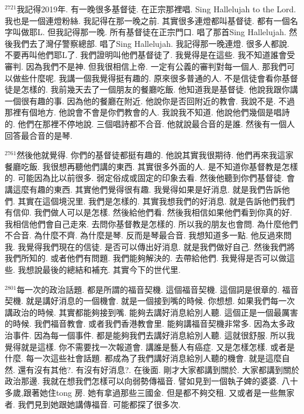 \documentclass{book}
\begin{document}
$^{2721}$我記得2019年.
有一晚很多基督徒.
在正宗那裡唱.
Sing Hallelujah to the Lord.
我也是一個連燈粉絲.
我記得在那一晚之前.
其實很多連燈都叫基督徒.
都有一個名字叫做耶L.
但我記得那一晚.
所有基督徒在正宗門口.
唱了那首Sing Hallelujah.
然後我們去了灣仔警察總部.
唱了Sing Hallelujah.
我記得那一晚連燈.
很多人都說.
不要再叫他們耶L了.
我們證明叫他們基督徒了.
我覺得是在這些.
我不知道誰會受審判.
因為我們不是神.
但我很相信上帝.
一定有公義的審判對每一個人.
那我們可以做些什麼呢.
我講一個我覺得挺有趣的.
原來很多普通的人.
不是信徒會看你基督徒是怎樣的.
我前幾天去了一個朋友的餐廳吃飯.
他知道我是基督徒.
他說我跟你講一個很有趣的事.
因為他的餐廳在附近.
他說你是否回附近的教會.
我說不是.
不過那裡有個地方.
他說會不會是你們教會的人.
我說我不知道.
他說他們幾個是唱詩的.
他們在那裡不停地說.
三個唱詩都不合音.
他就說最合音的是誰.
然後有一個人回答最合音的是琴.

$^{2761}$然後他就覺得.
你們的基督徒都挺有趣的.
他說其實我很期待.
他們再來我這家餐廳吃飯.
我很想再聽他們講的東西.
其實很多外面的人.
是不知道你基督教是怎樣的.
可能因為比以前很多.
弱定俗成或固定的印象去看.
然後他聽到你們基督徒.
會講這麼有趣的東西.
其實他們覺得很有趣.
我覺得如果是好消息.
就是我們告訴他們.
其實在這個境況里.
我們是怎樣的.
其實我想我們的好消息.
就是告訴他們我們有信仰.
我們做人可以是怎樣.
然後給他們看.
然後我相信如果他們看到你真的好.
我相信他們會自己走來.
去問你基督教是怎樣的.
所以我的朋友也會問.
為什麼他們不合音.
為什麼不齊.
為什麼是琴.
反而是琴最合音.
我想知道多一點.
他反過來問我.
我覺得我們現在的信徒.
是否可以傳出好消息.
就是我們做好自己.
然後我們將我們所知的.
或者他們有問題.
我們能夠解決的.
去帶給他們.
我覺得是否可以做這些.
我想說最後的總結和補充.
其實今下的世代里.

$^{2801}$每一次的政治話題.
都是所謂的福音契機.
這個福音契機.
這個詞是很章的.
福音契機.
就是講好消息的一個機會.
就是一個接到嘴的時候.
你想想.
如果我們每一次講政治的時候.
其實都能夠接到嘴.
能夠去講好消息給別人聽.
這個正是一個最厲害的時候.
我們福音教會.
或者我們香港教會里.
能夠講福音契機非常多.
因為太多政治事件.
因為每一個事件.
都是能夠我們去講好消息給別人聽.
這就很舒服.
所以我覺得就是這樣.
你不需要找一次報道會.
講誰是藝人有癌症.
又是怎樣怎樣.
或者是什麼.
每一次這些社會話題.
都成為了我們講好消息給別人聽的機會.
就是這麼自然.
還有沒有其他?.
有沒有好消息?.
在後面.
剛才大家都講到關於.
大家都講到關於政治那邊.
我就在想我們怎樣可以向弱勢傳福音.
譬如見到一個執子婢的婆婆.
八十多歲,跟著她住tong 房.
她有拿過那些三國金.
但是都不夠交租.
又或者是一些無家者.
我們見到她跟她講傳福音.
可能都探了很多次.
\end{document}
